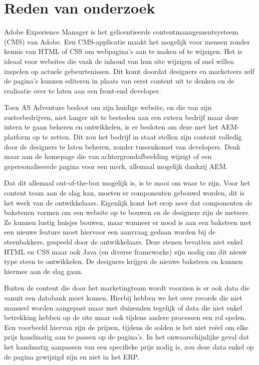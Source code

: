\documentclass{article}
\begin{document}
	\section{Reden van onderzoek}
	Adobe Experience Manager is het gelicentieerde  contentmanagementsysteem (CMS) van Adobe. 
	Een CMS-applicatie maakt het mogelijk voor mensen zonder kennis van HTML of CSS om webpagina’s aan te maken of te wijzigen. 
	Het is ideaal voor websites die vaak de inhoud van hun site wijzigen of snel willen inspelen op actuele gebeurtenissen. 
	Dit komt doordat designers en marketeers zelf de pagina's kunnen editeren in plaats van eerst content uit te denken en de realisatie over te laten aan een front-end developer. 
	\par
	Toen AS Adventure besloot om zijn huidige website, en die van zijn zusterbedrijven, niet langer uit te besteden aan een extern bedrijf maar deze intern te gaan beheren en ontwikkelen, is er besloten om deze met het AEM-platform op te zetten. 
	Dit zou het bedrijf in staat stellen zijn content volledig door de designers te laten beheren, zonder tussenkomst van developers.
	Denk maar aan de homepage die van achtergrondafbeelding wijzigt of een gepersonaliseerde pagina voor een merk, allemaal mogelijk dankzij AEM.
	\par
	Dat dit allemaal out-of-the-box mogelijk is, is te mooi om waar te zijn. Voor het content team aan de slag kan, moeten er componenten gebouwd worden, dit is het werk van de ontwikkelaars. Eigenlijk komt het erop neer dat componenten de bakstenen vormen om een website op te bouwen en de designers zijn de metsers. Ze kunnen lustig huisjes bouwen, maar wanneer er nood is aan een baksteen met een nieuwe feature moet hiervoor een aanvraag gedaan worden bij de steenbakkers, gespeeld door de ontwikkelaars. Deze stenen bevatten niet enkel HTML en CSS maar ook Java (en diverse frameworks) zijn nodig om dit nieuw type steen te ontwikkelen. De designers krijgen de nieuwe baksteen en kunnen hiermee aan de slag gaan.
	\par
	Buiten de content die door het marketingteam wordt voorzien is er ook data die vanuit een databank moet komen. 
	Hierbij hebben we het over records die niet manueel worden aangepast maar met duizenden tegelijk of data die niet enkel betrekking hebben op de site maar ook tijdens andere processen een rol spelen. 
	Een voorbeeld hiervan zijn de prijzen, tijdens de solden is het niet re\"eel om elke prijs handmatig aan te passen op de pagina’s. 
	In het onwaarschijnlijke geval dat het handmatig aanpassen van een specifieke prijs nodig is, zou deze data enkel op de pagina gewijzigd zijn en niet in het ERP. 
\end{document}
